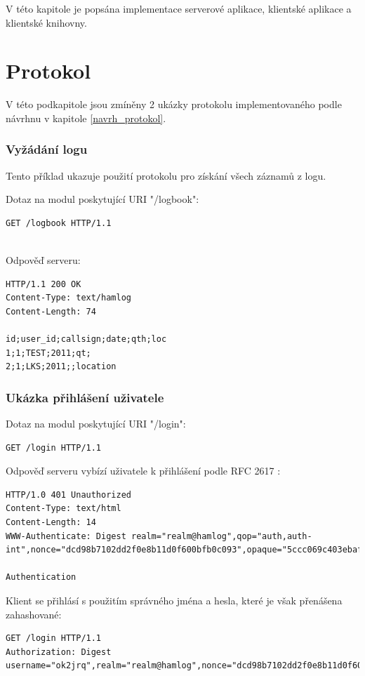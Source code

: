 V této kapitole je popsána implementace serverové aplikace, klientské aplikace a klientské knihovny.

\section{Protokol}
V této podkapitole jsou zmíněny 2 ukázky protokolu implementovaného podle návrhnu v kapitole \ref{navrh_protokol}.

\subsubsection{Vyžádání logu}

Tento příklad ukazuje použití protokolu pro získání všech záznamů z logu.

Dotaz na modul poskytující URI "/logbook":
\begin{verbatim}
GET /logbook HTTP/1.1


\end{verbatim}
Odpověď serveru:
\begin{verbatim}
HTTP/1.1 200 OK
Content-Type: text/hamlog
Content-Length: 74

id;user_id;callsign;date;qth;loc
1;1;TEST;2011;qt;
2;1;LKS;2011;;location
\end{verbatim}

\subsubsection{Ukázka přihlášení uživatele}

Dotaz na modul poskytující URI "/login":
\begin{verbatim}
GET /login HTTP/1.1

\end{verbatim}

Odpověď serveru vybízí uživatele k přihlášení podle RFC 2617 \cite{rfc2617}:
\begin{verbatim}
HTTP/1.0 401 Unauthorized
Content-Type: text/html
Content-Length: 14
WWW-Authenticate: Digest realm="realm@hamlog",qop="auth,auth-int",nonce="dcd98b7102dd2f0e8b11d0f600bfb0c093",opaque="5ccc069c403ebaf9f0171e9517f40e41"

Authentication
\end{verbatim}

Klient se přihlásí s použitím správného jména a hesla, které je však přenášena
zahashované:
\begin{verbatim}
GET /login HTTP/1.1
Authorization: Digest username="ok2jrq",realm="realm@hamlog",nonce="dcd98b7102dd2f0e8b11d0f600bfb0c093",uri="/login",qop=auth,response="d197141dc972c02d71e6a73b3396ed53",opaque="5ccc069c403ebaf9f0171e9517f40e41")

\end{verbatim}

